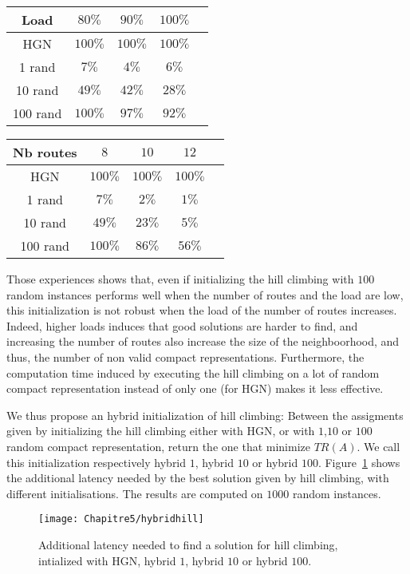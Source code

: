 \begin{minipage}[c]{.45\linewidth}
\vspace{-0.4cm}
\begin{tabular}{ |c|c|c|c|c| }
\hline
    Load & $80\%$& $90\%$ & $100\%$\\
    \hline
    HGN & $100\%$ & $100\%$& $100\%$ \\
    1 rand & $7\%$ & $4\%$& $6\%$\\
   10 rand & $49\%$& $42\%$& $28\%$\\
   100 rand & $100\%$ & $97\%$& $92\%$\\
    \hline
 \end{tabular}
 \label{tab:descenteload}
\vfill
 \end{minipage}
 \hfill
\begin{minipage}[c]{.45\linewidth}
\vfill
\begin{tabular}{ |c|c|c|c|c| }
\hline
    Nb routes & $8$& $10$ & $12$\\
    \hline
    HGN & $100\%$ & $100\%$& $100\%$ \\
    1 rand & $7\%$ & $2\%$& $1\%$\\
   10 rand & $49\%$& $23\%$& $5\%$\\
   100 rand & $100\%$ & $86\%$& $56\%$\\
    \hline
 \end{tabular}
 \label{tab:descentenbroutes}
\vfill
\end{minipage}

Those experiences shows that, even if initializing the hill climbing with $100$ random instances performs well when the number of routes and the load are low, this initialization is not robust when the load of the number of routes increases. Indeed, higher loads induces that good solutions are harder to find, and increasing the number of routes also increase the size of the neighboorhood, and thus, the number of non valid compact representations. Furthermore, the computation time induced by executing the hill climbing on a lot of random compact representation instead of only one (for HGN) makes it less effective.


We thus propose an hybrid initialization of hill climbing: Between the assigments given by initializing the hill climbing either with HGN, or with $1$,$10$ or $100$ random compact representation, return the one that minimize $TR(A)$. We call this initialization respectively hybrid $1$, hybrid $10$ or hybrid $100$.
Figure~\ref{fig:hybridhill} shows the additional latency needed by the best solution given by hill climbing, with different initialisations. The results are computed on $1000$ random instances.
\begin{figure}[h]
	\centering
	\texttt{[image: Chapitre5/hybridhill]}
\caption{ Additional latency needed to find a solution for hill climbing, intialized with HGN, hybrid $1$, hybrid $10$ or hybrid $100$.}
\label{fig:hybridhill}
\end{figure}

